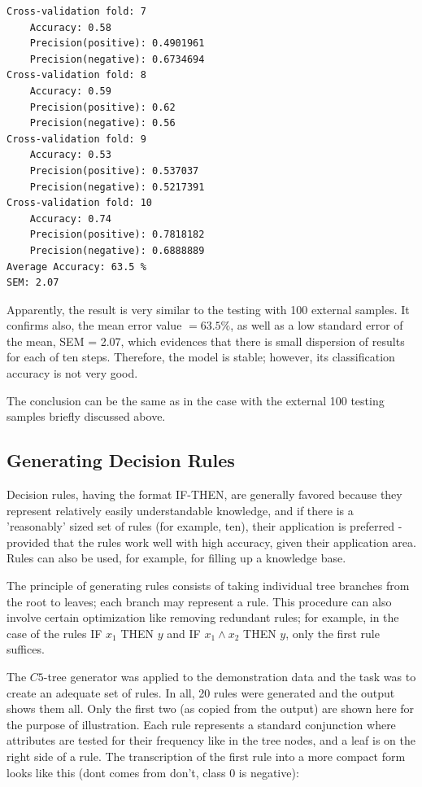 \begin{verbatim}
Cross-validation fold: 7
    Accuracy: 0.58
    Precision(positive): 0.4901961
    Precision(negative): 0.6734694
Cross-validation fold: 8
    Accuracy: 0.59
    Precision(positive): 0.62
    Precision(negative): 0.56
Cross-validation fold: 9
    Accuracy: 0.53
    Precision(positive): 0.537037
    Precision(negative): 0.5217391
Cross-validation fold: 10
    Accuracy: 0.74
    Precision(positive): 0.7818182
    Precision(negative): 0.6888889
Average Accuracy: 63.5 %
SEM: 2.07
\end{verbatim}

Apparently, the result is very similar to the testing with 100 external samples. It confirms also, the mean error value $=63.5 \%$, as well as a low standard error of the mean, SEM = 2.07, which evidences that there is small dispersion of results for each of ten steps. Therefore, the model is stable; however, its classification accuracy is not very good.

The conclusion can be the same as in the case with the external 100 testing samples briefly discussed above.

\subsection{Generating Decision Rules}
Decision rules, having the format IF-THEN, are generally favored because they represent relatively easily understandable knowledge, and if there is a 'reasonably' sized set of rules (for example, ten), their application is preferred - provided that the rules work well with high accuracy, given their application area. Rules can also be used, for example, for filling up a knowledge base.

The principle of generating rules consists of taking individual tree branches from the root to leaves; each branch may represent a rule. This procedure can also involve certain optimization like removing redundant rules; for example, in the case of the rules IF $x_{1}$ THEN $y$ and IF $x_{1} \wedge x_{2}$ THEN $y$, only the first rule suffices.

The $C 5$-tree generator was applied to the demonstration data and the task was to create an adequate set of rules. In all, 20 rules were generated and the output shows them all. Only the first two (as copied from the output) are shown here for the purpose of illustration. Each rule represents a standard conjunction where attributes are tested for their frequency like in the tree nodes, and a leaf is on the right side of a rule. The transcription of the first rule into a more compact form looks like this (dont comes from don't, class 0 is negative):

